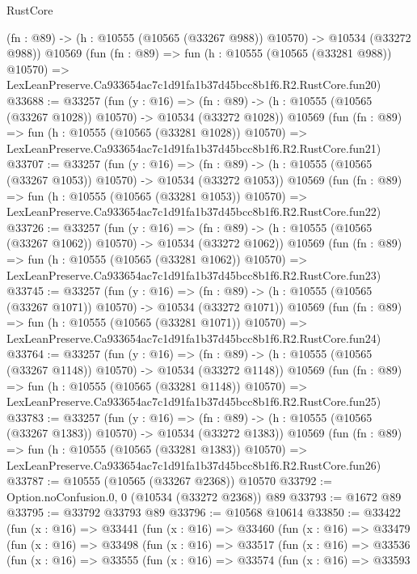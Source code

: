 \begin{lexlean}{RustCore}
\begin{coremodule}
    (fn : @89) -> (h : @10555 (@10565 (@33267 @988)) @10570) -> @10534 (@33272 @988))
    @10569
    (fun (fn : @89) =>
    fun (h : @10555 (@10565 (@33281 @988)) @10570) =>
    LexLeanPreserve.Ca933654ac7c1d91fa1b37d45bcc8b1f6.R2.RustCore.fun20)
@33688 := @33257
    (fun (y : @16) =>
    (fn : @89) -> (h : @10555 (@10565 (@33267 @1028)) @10570) -> @10534 (@33272 @1028))
    @10569
    (fun (fn : @89) =>
    fun (h : @10555 (@10565 (@33281 @1028)) @10570) =>
    LexLeanPreserve.Ca933654ac7c1d91fa1b37d45bcc8b1f6.R2.RustCore.fun21)
@33707 := @33257
    (fun (y : @16) =>
    (fn : @89) -> (h : @10555 (@10565 (@33267 @1053)) @10570) -> @10534 (@33272 @1053))
    @10569
    (fun (fn : @89) =>
    fun (h : @10555 (@10565 (@33281 @1053)) @10570) =>
    LexLeanPreserve.Ca933654ac7c1d91fa1b37d45bcc8b1f6.R2.RustCore.fun22)
@33726 := @33257
    (fun (y : @16) =>
    (fn : @89) -> (h : @10555 (@10565 (@33267 @1062)) @10570) -> @10534 (@33272 @1062))
    @10569
    (fun (fn : @89) =>
    fun (h : @10555 (@10565 (@33281 @1062)) @10570) =>
    LexLeanPreserve.Ca933654ac7c1d91fa1b37d45bcc8b1f6.R2.RustCore.fun23)
@33745 := @33257
    (fun (y : @16) =>
    (fn : @89) -> (h : @10555 (@10565 (@33267 @1071)) @10570) -> @10534 (@33272 @1071))
    @10569
    (fun (fn : @89) =>
    fun (h : @10555 (@10565 (@33281 @1071)) @10570) =>
    LexLeanPreserve.Ca933654ac7c1d91fa1b37d45bcc8b1f6.R2.RustCore.fun24)
@33764 := @33257
    (fun (y : @16) =>
    (fn : @89) -> (h : @10555 (@10565 (@33267 @1148)) @10570) -> @10534 (@33272 @1148))
    @10569
    (fun (fn : @89) =>
    fun (h : @10555 (@10565 (@33281 @1148)) @10570) =>
    LexLeanPreserve.Ca933654ac7c1d91fa1b37d45bcc8b1f6.R2.RustCore.fun25)
@33783 := @33257
    (fun (y : @16) =>
    (fn : @89) -> (h : @10555 (@10565 (@33267 @1383)) @10570) -> @10534 (@33272 @1383))
    @10569
    (fun (fn : @89) =>
    fun (h : @10555 (@10565 (@33281 @1383)) @10570) =>
    LexLeanPreserve.Ca933654ac7c1d91fa1b37d45bcc8b1f6.R2.RustCore.fun26)
@33787 := @10555 (@10565 (@33267 @2368)) @10570
@33792 := Option.noConfusion.{0, 0} (@10534 (@33272 @2368)) @89
@33793 := @1672 @89
@33795 := @33792 @33793 @89
@33796 := @10568 @10614
@33850 := @33422
    (fun (x : @16) =>
    @33441
      (fun (x : @16) =>
      @33460
        (fun (x : @16) =>
        @33479
          (fun (x : @16) =>
          @33498
            (fun (x : @16) =>
            @33517
              (fun (x : @16) =>
              @33536
                (fun (x : @16) =>
                @33555
                  (fun (x : @16) =>
                  @33574
                    (fun (x : @16) =>
                    @33593

\end{coremodule}
\end{lexlean}
